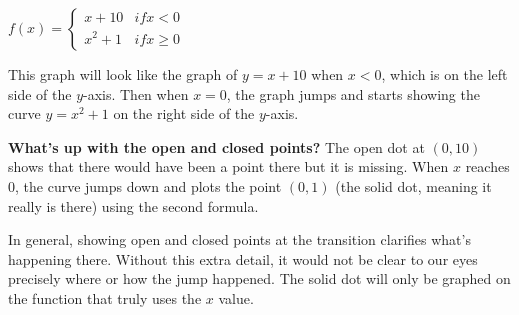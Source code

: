 \documentclass{ximera}
\begin{document}
\begin{example}
$f(x)=\begin{cases} x+10 & \textit{if}x<0\\x^2+1 & \textit{if} x\geq 0\end{cases}$

This graph will look like the graph of $y=x+10$ when $x<0$, which is on the left side of the $y$-axis. Then when $x=0$, the graph jumps and starts showing the curve $y=x^2+1$ on the right side of the $y$-axis.


\textbf{What's up with the open and closed points?} The open dot at $(0,10)$ shows that there would have been a point there but it is missing. When $x$ reaches $0$, the curve jumps down and plots the point $(0,1)$ (the solid dot, meaning it really is there) using the second formula.

In general, showing open and closed points at the transition clarifies what's happening there. Without this extra detail, it would not be clear to our eyes precisely where or how the jump happened. The solid dot will only be graphed on the function that truly uses the $x$ value.
\end{example}
\end{document}
